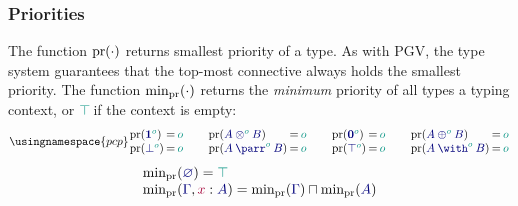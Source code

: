 \documentclass[main.tex]{subfiles}
\begin{document}
\subsubsection*{Priorities}
The function $\operatorname{pr}(\cdot)$ returns smallest priority of a type. As with PGV, the type system guarantees that the top-most connective always holds the smallest priority.  The function $\text{min}_{\operatorname{pr}}(\cdot)$ returns the \emph{minimum} priority of all types a typing context, or $\cs{\ptop}$ if the context is empty:
\[
  \usingnamespace{pcp}
  \setlength{\arraycolsep}{1pt}
  \begin{array}{lclclcl}
    \pr(\ty{\tyone[\cs{o}]})        & = & \cs{o} \\
    \pr(\ty{\tybot[\cs{o}]})        & = & \cs{o}
  \end{array}
  \qquad
  \begin{array}{lclclcl}
    \pr(\ty{\tytens[\cs{o}]{A}{B}}) & = & \cs{o} \\
    \pr(\ty{\typarr[\cs{o}]{A}{B}}) & = & \cs{o}
  \end{array}
  \qquad
  \begin{array}{lclclcl}
    \pr(\ty{\tynil[\cs{o}]})        & = & \cs{o} \\
    \pr(\ty{\tytop[\cs{o}]})        & = & \cs{o}
  \end{array}
  \qquad
  \begin{array}{lclclcl}
    \pr(\ty{\typlus[\cs{o}]{A}{B}}) & = & \cs{o} \\
    \pr(\ty{\tywith[\cs{o}]{A}{B}}) & = & \cs{o} 
  \end{array}
\]
\[
  \begin{array}{l}
    \minpr(\ty{\emptyenv})          = \cs{\ptop}
    \\
    \minpr(\ty{\Gamma},\tmty{x}{A}) = \minpr(\ty{\Gamma})\sqcap\minpr(\ty{A})
  \end{array}
\]
\end{document}
